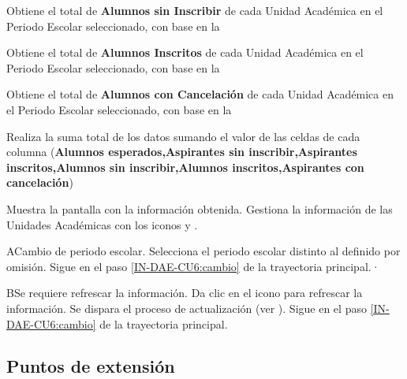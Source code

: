 \begin{UCtrayectoria}
      \UCpaso Obtiene el total de \textbf{Alumnos sin Inscribir} de cada Unidad Académica en el Periodo Escolar seleccionado, con base en la 
          
      \UCpaso Obtiene el total de \textbf{Alumnos Inscritos} de cada Unidad Académica en el Periodo Escolar seleccionado, con base en la 
      
      \UCpaso Obtiene el total de \textbf{Alumnos con Cancelación} de cada Unidad Académica en el Periodo Escolar seleccionado, con base en la 
    
    
    \UCpaso Realiza la suma total de los datos sumando el valor de las celdas de cada columna (\textbf{Alumnos esperados,Aspirantes sin inscribir,Aspirantes inscritos,Alumnos sin inscribir,Alumnos inscritos,Aspirantes con cancelación})
    
    
    
    
    \UCpaso \label{IN-DAE-CU6:recarga} Muestra la pantalla  con la información obtenida. %
    \UCpaso [\UCactor] Gestiona la información de las Unidades Académicas con los iconos \IUVer y  \IUSincro.
\end{UCtrayectoria}


\begin{UCtrayectoriaA}{A}{Cambio de periodo escolar.}
	\UCpaso [\UCactor] 	Selecciona el periodo escolar distinto al definido por omisión.
	\UCpaso Sigue en el paso \ref{IN-DAE-CU6:cambio}  de la trayectoria principal.·
\end{UCtrayectoriaA}

\begin{UCtrayectoriaA}{B}{Se requiere refrescar la información.}
	\UCpaso [\UCactor] 	Da clic en el icono \IUSincro para refrescar la información.
	\UCpaso Se dispara el proceso de actualización (ver ).
	\UCpaso Sigue en el paso \ref{IN-DAE-CU6:cambio}  de la trayectoria principal.
\end{UCtrayectoriaA}

\subsection{Puntos de extensión}


